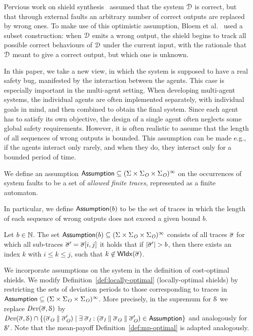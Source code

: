 Pervious work on shield synthesis~\cite{KonighoferABHKT17,BloemKKW15} assumed that the system $\mathcal{D}$ is correct,
but that through external faults an arbitrary number of correct outputs are replaced by wrong ones. To make use of this optimistic assumption, Bloem et al.~\cite{BloemKKW15}
used a subset construction:  when $\mathcal{D}$ emits a wrong output, the shield begins to track all possible correct behaviours of $\mathcal{D}$ under the current input, with the rationale that $\mathcal{D}$ meant to give a correct output, but which one is unknown.

In this paper, we take a new view, in which the system is supposed to have a real safety bug, manifested by the interaction between the agents. This case is especially important in the multi-agent  setting.
When developing multi-agent systems, the individual agents are often implemented separately, with individual goals in mind, and then combined to obtain the final system. Since each agent has to satisfy its own objective, the design of a single agent often neglects some global safety requirements.
However, it is often realistic to assume that the length of all sequences of wrong outputs is bounded. This assumption can be made e.g., if the agents  interact only rarely, and when they do,  they interact only for a bounded period of time.

We define an assumption $\mathsf{Assumption}\subseteq (\Sigma \times \Sigma_{\textit{O}} \times \Sigma_{\textit{O}})^\infty$ on the occurrences of system faults
to be a set of \emph{allowed finite traces}, represented as a finite automaton.

In particular, we define $\mathsf{Assumption}(b)$ to be the set of traces in which the length of each sequence of wrong outputs does not exceed a given bound $b$.
\begin{defn}
Let  $b\in\mathbb{N}$. The set $\mathsf{Assumption}(b)\subseteq (\Sigma \times \Sigma_{\textit{O}} \times \Sigma_{\textit{O}})^\infty$ consists of all traces $\overline\sigma$ for which all sub-traces $\overline\sigma' = \overline\sigma[i,j]$ it holds that if $|\overline\sigma'| > b$, then there exists an index $k$ with $i \leq k \leq j$, such that $k \not \in \mathsf{WIdx}(\overline\sigma)$.
\end{defn}

We incorporate assumptions on the system in the definition of cost-optimal shields.
We modify Definition~\ref{def:locally-optimal} (locally-optimal shields) by restricting the sets of deviation periods to those corresponding to traces in $\mathsf{Assumption} \subseteq (\Sigma \times \Sigma_{\textit{O}} \times \Sigma_{\textit{O}})^\infty$. More precisely, in the supremum  for $\mathcal{S}$ we replace $\mathit{Dev}(\overline\sigma,\mathcal{S})$ by $\mathit{Dev}(\overline\sigma,\mathcal{S}) \cap \{(\overline\sigma_{\textit{O}}\parallel\overline\sigma_{\textit{O}}')\mid \exists\; \overline\sigma_{\textit{I}}: (\overline\sigma_{\textit{I}}\parallel\overline\sigma_{\textit{O}}\parallel\overline\sigma_{\textit{O}}')\in \mathsf{Assumption}\}$ and analogously for $\mathcal{S}'$. 
\iftrue Note that the mean-payoff
Definition~\ref{def:mp-optimal} is adapted analogously.
\fi

